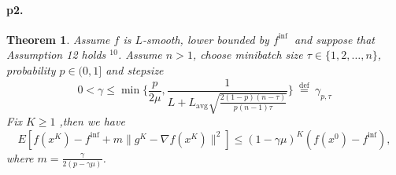 \documentclass[12pt,a4paper]{article}
\newtheorem*{theorem}{Theorem}
\begin{document}
	\paragraph{p2.}
	\begin{theorem}
		Assume $f$ is $L$-smooth, lower bounded by $f^{\text {inf }}$ and suppose that Assumption 12 holds $^{10}$. Assume $n>1$, choose minibatch size $\tau \in\{1,2, \ldots, n\}$, probability $p \in(0,1]$ and stepsize
		$$
		0<\gamma \leq \min\{\frac{p}{2\mu},\frac{1}{L+L_{\mathrm{avg}} \sqrt{\frac{2(1-p)(n-\tau)}{p(n-1) \tau}}}\} \stackrel{\text { def }}{=} \gamma_{p, \tau}
		$$
		Fix $K \geq 1$ ,then we have
		\begin{equation*}
			E\left[f\left(x^{K}\right)-f^{\mathrm{inf}}+m\|g^{K}-\nabla f(x^{K})\|^2\right]\leq (1-\gamma\mu)^K(f(x^0)-f^{\inf}),
		\end{equation*}
	where $m=\frac{\gamma}{2(p-\gamma\mu)}$.
	\end{theorem}
\end{document}
